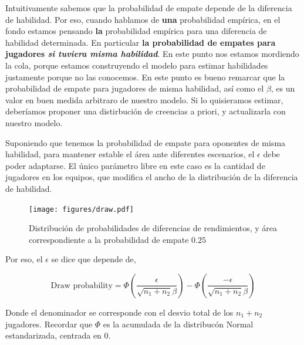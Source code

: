 \documentclass[article]{jss}
\begin{document}
Intuitivamente sabemos que la probabilidad de empate depende de la diferencia de habilidad.
Por eso, cuando hablamos de \textbf{una} probabilidad emp\'irica, en el fondo estamos pensando \textbf{la} probabilidad emp\'irica para una diferencia de habilidad determinada.
En particular \textbf{la probabilidad de empates para jugadores \emph{si tuviera misma habilidad}}.
En este punto nos estamos mordiendo la cola, porque estamos construyendo el modelo para estimar habilidades justamente porque no las conocemos.
En este punto es bueno remarcar que la probabilidad de empate para jugadores de misma habilidad, as\'i como el $\beta$, es un valor en buen medida arbitraro de nuestro modelo.
Si lo quisieramos estimar, deber\'iamos proponer una distirbuci\'on de creencias a priori, y actualizarla con nuestro modelo.

\vspace{0.3cm}

Suponiendo que tenemos la probabilidad de empate para oponentes de misma habilidad, para mantener estable el \'area ante diferentes escenarios, el $\epsilon$ debe poder adaptarse.
El \'unico par\'ametro libre en este caso es la cantidad de jugadores en los equipos, que modifica el ancho de la distribuci\'on de la diferencia de habilidad.

\begin{figure}[H]
\centering
  \texttt{[image: figures/draw.pdf]}
  \caption{Distribuci\'on de probabilidades de diferencias de rendimientos, y \'area correspondiente a la probabilidad de empate $0.25$}
  \label{fig:draw}
\end{figure}

Por eso, el $\epsilon$ se dice que depende de, 

\begin{equation}
 \text{Draw probability} = \Phi(\frac{\epsilon}{\sqrt{n_1+n_2}\beta}) - \Phi(\frac{-\epsilon}{\sqrt{n_1+n_2}\beta})
\end{equation}

Donde el denominador se corresponde con el desvio total de los $n_1 + n_2$ jugadores.
Recordar que $\Phi$ es la acumulada de la distribuc\'on Normal estandarizada, centrada en 0. 


 
 
 
 
 
 
\end{document}
